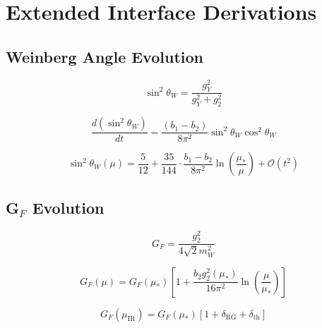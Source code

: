 \documentclass[11pt,a4paper]{article}
\theoremstyle{definition}
\begin{document}
\section{Extended Interface Derivations}
\label{app:interface_ext}

\subsection{Weinberg Angle Evolution}
\label{subsec:sw2_evolution}

\begin{equation}
\label{eq:sw2_def_ext}
\sin^2\theta_W = \frac{g_Y^2}{g_Y^2 + g_2^2}
\end{equation}

\begin{equation}
\label{eq:dsw2_dt}
\frac{d(\sin^2\theta_W)}{dt} = \frac{(b_1 - b_2)}{8\pi^2}\sin^2\theta_W\cos^2\theta_W
\end{equation}

\begin{equation}
\label{eq:sw2_solution}
\sin^2\theta_W(\mu) = \frac{5}{12} + \frac{35}{144}\cdot\frac{b_1 - b_2}{8\pi^2}\ln\left(\frac{\mu_*}{\mu}\right) + \mathcal{O}(t^2)
\end{equation}

\subsection{G$_F$ Evolution}
\label{subsec:GF_evolution}

\begin{equation}
\label{eq:GF_def_ext}
G_F = \frac{g_2^2}{4\sqrt{2}m_W^2}
\end{equation}

\begin{equation}
\label{eq:GF_running_ext}
G_F(\mu) = G_F(\mu_*)\left[1 + \frac{b_2 g_2^2(\mu_*)}{16\pi^2}\ln\left(\frac{\mu}{\mu_*}\right)\right]
\end{equation}

\begin{equation}
\label{eq:GF_threshold}
G_F(\mu_{\text{IR}}) = G_F(\mu_*)\left[1 + \delta_{\text{RG}} + \delta_{\text{th}}\right]
\end{equation}
\end{document}
